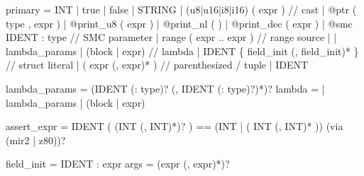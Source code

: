 \documentclass[
  11pt,
  a4paper,
]{report}
\newenvironment{Shaded}{\begin{snugshade}\small}{\end{snugshade}}
\newcommand{\NormalTok}[1]{#1}
\begin{document}
\begin{Shaded}
\begin{Highlighting}[]
\NormalTok{primary        = INT | \textquotesingle{}true\textquotesingle{} | \textquotesingle{}false\textquotesingle{} | STRING}
\NormalTok{               | (\textquotesingle{}u8\textquotesingle{}|\textquotesingle{}u16\textquotesingle{}|\textquotesingle{}i8\textquotesingle{}|\textquotesingle{}i16\textquotesingle{}) \textquotesingle{}(\textquotesingle{} expr \textquotesingle{})\textquotesingle{}   // cast}
\NormalTok{               | \textquotesingle{}@ptr\textquotesingle{} \textquotesingle{}(\textquotesingle{} type \textquotesingle{},\textquotesingle{} expr \textquotesingle{})\textquotesingle{}}
\NormalTok{               | \textquotesingle{}@print\_u8\textquotesingle{} \textquotesingle{}(\textquotesingle{} expr \textquotesingle{})\textquotesingle{} | \textquotesingle{}@print\_nl\textquotesingle{} \textquotesingle{}(\textquotesingle{} \textquotesingle{})\textquotesingle{} | \textquotesingle{}@print\_dec\textquotesingle{} \textquotesingle{}(\textquotesingle{} expr \textquotesingle{})\textquotesingle{}}
\NormalTok{               | \textquotesingle{}@smc\textquotesingle{} IDENT \textquotesingle{}:\textquotesingle{} type              // SMC parameter}
\NormalTok{               | \textquotesingle{}range\textquotesingle{} \textquotesingle{}(\textquotesingle{} expr \textquotesingle{}..\textquotesingle{} expr \textquotesingle{})\textquotesingle{}     // range source}
\NormalTok{               | \textquotesingle{}|\textquotesingle{} lambda\_params \textquotesingle{}|\textquotesingle{} (block | expr)    // lambda}
\NormalTok{               | IDENT \textquotesingle{}\{\textquotesingle{} field\_init (\textquotesingle{},\textquotesingle{} field\_init)* \textquotesingle{}\}\textquotesingle{}  // struct literal}
\NormalTok{               | \textquotesingle{}(\textquotesingle{} expr (\textquotesingle{},\textquotesingle{} expr)* \textquotesingle{})\textquotesingle{}           // parenthesized / tuple}
\NormalTok{               | IDENT}

\NormalTok{lambda\_params  = (IDENT (\textquotesingle{}:\textquotesingle{} type)? (\textquotesingle{},\textquotesingle{} IDENT (\textquotesingle{}:\textquotesingle{} type)?)*)?}
\NormalTok{lambda         = \textquotesingle{}|\textquotesingle{} lambda\_params \textquotesingle{}|\textquotesingle{} (block | expr)}

\NormalTok{assert\_expr    = IDENT \textquotesingle{}(\textquotesingle{} (INT (\textquotesingle{},\textquotesingle{} INT)*)? \textquotesingle{})\textquotesingle{} \textquotesingle{}==\textquotesingle{} (INT | \textquotesingle{}(\textquotesingle{} INT (\textquotesingle{},\textquotesingle{} INT)* \textquotesingle{})\textquotesingle{})}
\NormalTok{                 (\textquotesingle{}via\textquotesingle{} (\textquotesingle{}mir2\textquotesingle{} | \textquotesingle{}z80\textquotesingle{}))?}

\NormalTok{field\_init     = IDENT \textquotesingle{}:\textquotesingle{} expr}
\NormalTok{args           = (expr (\textquotesingle{},\textquotesingle{} expr)*)?}
\end{Highlighting}
\end{Shaded}
\end{document}
